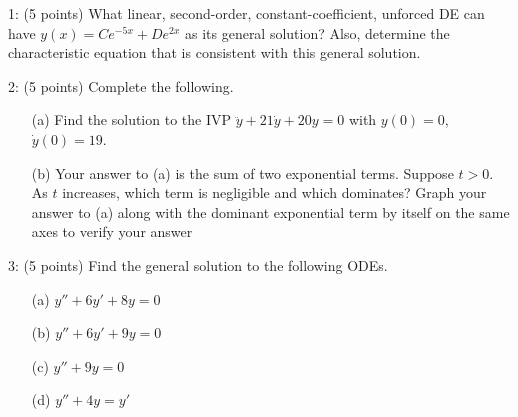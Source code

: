 \documentclass[12pt,letterpaper]{hmcpset}
\begin{document}
\begin{problem}
1: (5 points) What linear, second-order, constant-coefficient, unforced DE can have $y(x) =Ce^{-5x} + De^{2x}$ as its general solution? Also, determine the characteristic equation that is
consistent with this general solution.
\end{problem}
\newpage

\begin{problem}
2: (5 points) Complete the following.

\begin{enumerate}
    \item[(a)] Find the solution to the IVP $\ddot{y} + 21\dot{y} + 20y = 0$ with $y(0) = 0$, $\dot{y}(0) = 19$.
    \item[(b)] Your answer to (a) is the sum of two exponential terms. Suppose $t > 0$. As $t$ increases,
which term is negligible and which dominates? Graph your answer to (a) along with
the dominant exponential term by itself on the same axes to verify your answer
\end{enumerate}

\end{problem}
\newpage

\begin{problem}
3: (5 points) Find the general solution to the following ODEs.

\begin{enumerate}
    \item[(a)] $y'' + 6y' + 8y = 0$
    \item[(b)] $y'' + 6y' + 9y = 0$
    \item[(c)] $y'' + 9y = 0$
    \item[(d)] $y'' + 4y = y'$
\end{enumerate}
\end{problem}
\newpage
\end{document}
